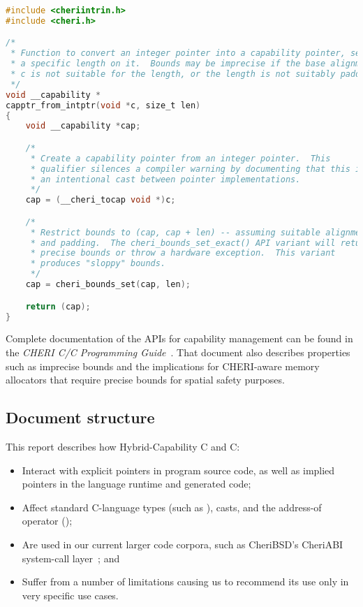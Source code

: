 \documentclass[12pt,twoside,openright,a4paper]{article}
\newcommand{\ccode}[1]{{\small\ttfamily{#1}}}
\newcommand{\cintptrt}{{\ccode{intptr\_t}}\xspace}
\newcommand*{\cpp}{\texorpdfstring{C\textsmaller[2]{\protect\nolinebreak[4]\hspace{-.05em}\raisebox{.45ex}{\textbf{++}}}}{C++}}
\newcommand*{\COrCpp}{C/\cpp{}}
\newcommand*{\purecapCOrCpp}{CHERI \COrCpp{}}
\newcommand*{\CAndCpp}{C and \cpp{}}
\newcommand*{\hybridCAndCpp}{Hybrid-Capability \CAndCpp{}}
\begin{document}
\begin{lstlisting}[language=C]
#include <cheriintrin.h>
#include <cheri.h>

/*
 * Function to convert an integer pointer into a capability pointer, setting
 * a specific length on it.  Bounds may be imprecise if the base alignment of
 * c is not suitable for the length, or the length is not suitably padded.
 */
void __capability *
capptr_from_intptr(void *c, size_t len)
{
	void __capability *cap;

	/*
	 * Create a capability pointer from an integer pointer.  This
	 * qualifier silences a compiler warning by documenting that this is
	 * an intentional cast between pointer implementations.
	 */
	cap = (__cheri_tocap void *)c;

	/*
	 * Restrict bounds to (cap, cap + len) -- assuming suitable alignment
	 * and padding.  The cheri_bounds_set_exact() API variant will return
	 * precise bounds or throw a hardware exception.  This variant
	 * produces "sloppy" bounds.
	 */
	cap = cheri_bounds_set(cap, len);

	return (cap);
}
\end{lstlisting}

\noindent
Complete documentation of the APIs for capability management can be found in
the \textit{\purecapCOrCpp{} Programming Guide}~\cite{UCAM-CL-TR-947}.
That document also describes properties such as imprecise bounds and the
implications for CHERI-aware memory allocators that require precise bounds for
spatial safety purposes.

\subsection{Document structure}

This report describes how \hybridCAndCpp{}:

\begin{itemize}
\item Interact with explicit pointers in program source code, as well as
  implied pointers in the language runtime and generated code;
\item Affect standard C-language types (such as \cintptrt{}), casts, and the
  address-of operator (\ccode{\&});
\item Are used in our current larger code corpora, such as CheriBSD's
  CheriABI system-call layer~\cite{davis2019:cheriabi}; and
\item Suffer from a number of limitations causing us to recommend its use
  only in very specific use cases.
\end{itemize}
\end{document}

